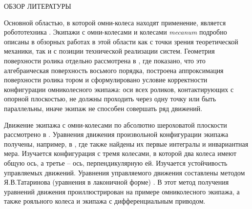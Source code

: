 ОБЗОР ЛИТЕРАТУРЫ


Основной областью, в которой омни-колеса находят применение, является робототехника \cite{Seeni2010,Martynenko2005,GolubevSnake2004}. Экипажи с омни-колесами и колесами \textit{mecanum} \cite{Ilon} подробно описаны в обзорных работах в этой области \cite{Campion1996,Zimmermann2009,ChungIagnemma2016,Kanjanawanishkul2015,Adascalitei2011} как с точки зрения теоретической механики, так и с позиции технической реализации систем. Геометрия поверхности ролика отдельно рассмотрена в \cite{Gfrerrer2008}, где показано, что это алгебраическая поверхность восьмого порядка, построена аппроксимация поверхности ролика тором и сформулировано условие корректности конфигурации омниколесного экипажа: оси всех роликов, контактирующих с опорной плоскостью, не должны проходить через одну точку или быть параллельны, иначе экипаж не способен совершать ряд движений.

Движение экипажа с омни-колесами по абсолютно шероховатой плоскости рассмотрено в \cite{ZobovaTatarinovAspecty2006,zobova2008svobodnye8020851,ZobovaTatarinovPMM,Zobova2011}. Уравнения движения произвольной конфигурации экипажа получены, например, в \cite{ZobovaTatarinovPMM}, где также найдены их первые интегралы и инвариантная мера. Изучается конфигурация с тремя колесами, в которой два колеса имеют общую ось, а третье -- ось, перпендикулярную ей. Изучается устойчивость управляемых движений. Уравнения управляемого движения составлены методом Я.В.Татаринова (уравнения в лаконичной форме) \cite{Tatarinov,Tatarinov2005}. В \cite{Zobova2011} этот метод получения уравнений движения  проиллюстрирован на примере омниколесного экипажа, а также рояльного колеса и экипажа с дифференциальным приводом.

